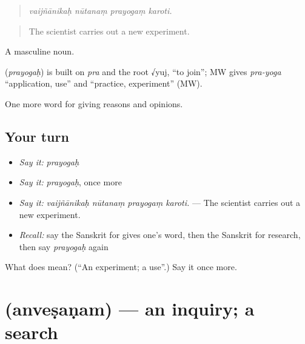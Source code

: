 \begin{quote}
   
\end{quote}

\begin{quote}
\emph{vaijñānikaḥ nūtanaṃ prayogaṃ karoti.}
\end{quote}

\begin{quote}
The scientist carries out a new experiment.
\end{quote}

A masculine noun.

\begin{cousinweb}
\textbf{} (\emph{prayogaḥ}) is built on \emph{pra} and the root √yuj, \textquotedblleft{}to join\textquotedblright{}; MW gives \emph{pra-yoga} \textquotedblleft{}application, use\textquotedblright{} and \textquotedblleft{}practice, experiment\textquotedblright{} (MW).
\end{cousinweb}

\begin{grammarlens}[title={What you've built}]
One more word for giving reasons and opinions.
\end{grammarlens}

\subsection*{Your turn}
\begin{itemize}
\raggedright
  \item \emph{Say it:} \emph{prayogaḥ}
  \item \emph{Say it:} \emph{prayogaḥ}, once more
  \item \emph{Say it:} \emph{vaijñānikaḥ nūtanaṃ prayogaṃ karoti.} — The scientist carries out a new experiment.
  \item \emph{Recall:} say the Sanskrit for gives one's word, then the Sanskrit for research, then say \emph{prayogaḥ} again
\end{itemize}

\begin{tcolorbox}[breakable,colback=teal!4,colframe=teal!35!black,title={Before you move on}]
What does  mean? (\textquotedblleft{}An experiment; a use\textquotedblright{}.) Say it once more.
\end{tcolorbox}
\section[\texorpdfstring{\sk{अन्वेषणम्} (anveṣaṇam)}{अन्वेषणम् (anveṣaṇam)}]{ (anveṣaṇam) — an inquiry; a search}

